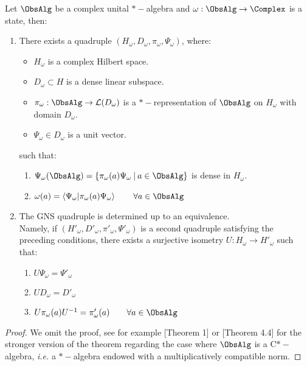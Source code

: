\documentclass[Main]{subfiles}
\begin{document}
				\begin{theorem}
					Let $\ObsAlg$ be a complex unital $\ast-$algebra and $\omega: \ObsAlg \rightarrow \Complex$ is a state, then:
					\begin{enumerate}
						\item There exists a quadruple $\left( H_\omega, D_\omega, \pi_\omega, \Psi_\omega \right)$, where:
							\begin{itemize}
								\item $H_\omega$ is a complex Hilbert space.
								\item $D_\omega \subset H$ is a dense linear subspace.
								\item $\pi_\omega:\ObsAlg \rightarrow  \mathcal{L}(D_\omega)$ is a $\ast-$representation of $\ObsAlg$ on $H_\omega$ with domain $D_\omega$.
								\item $\Psi_\omega \in D_\omega$ is a unit vector.
							\end{itemize}
							such that:
							\begin{enumerate}
								\item
								$\Psi_\omega ( \ObsAlg) = \left\lbrace \pi_\omega ( a) \Psi_\omega \: \vert \: a \in \ObsAlg \right\rbrace$ is dense in $H_\omega$.
								\item $\omega (a) = \left\langle \Psi_\omega \vert \pi_\omega ( a) \Psi_\omega \right\rangle \qquad \forall a \in \ObsAlg$
							\end{enumerate}
							\item The GNS quadruple is determined up to an equivalence. \\Namely, if $\left( H'_\omega, D'_\omega, \pi'_\omega, \Psi'_\omega \right)$ is a second quadruple satisfying the preceding conditions, there exists a surjective isometry $U: H_\omega \rightarrow H'_\omega$ such that:
							\begin{enumerate}
								\item $U \Psi_\omega = \Psi'_\omega$
								\item $U D_\omega = D'_\omega$
								\item $U \pi_\omega(a) U^{-1} = \pi'_\omega (a) \qquad \forall a \in \ObsAlg$
							\end{enumerate}
					\end{enumerate}							
				\end{theorem}
				\begin{proof}
					We omit the proof, see for example \cite{Khavkine2014a}[Theorem 1] or \cite{benini2013}[Theorem 4.4] for the stronger version of the theorem regarding the case where $\ObsAlg$ is a C$\ast-$algebra,  \textit{i.e.} a $\ast-$algebra endowed with a multiplicatively compatible norm.
				\end{proof}
				
\end{document}
